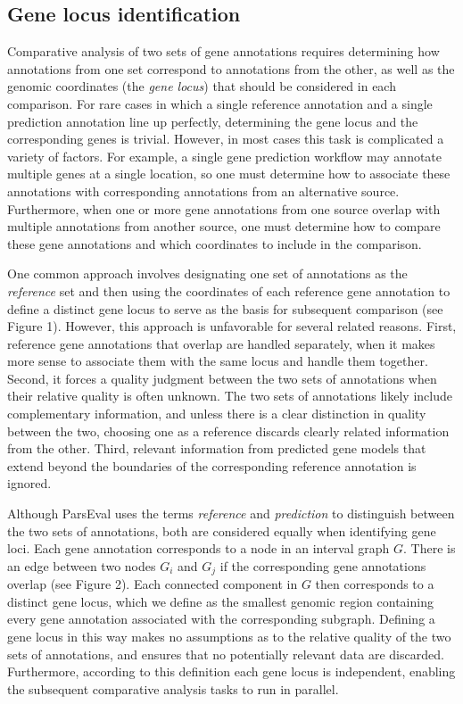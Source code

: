 \subsection{Gene locus identification}
Comparative analysis of two sets of gene annotations requires determining how annotations from one set correspond to annotations from the other, as well as the genomic coordinates (the \emph{gene locus}) that should be considered in each comparison.
For rare cases in which a single reference annotation and a single prediction annotation line up perfectly, determining the gene locus and the corresponding genes is trivial.
However, in most cases this task is complicated a variety of factors.
For example, a single gene prediction workflow may annotate multiple genes at a single location, so one must determine how to associate these annotations with corresponding annotations from an alternative source.
Furthermore, when one or more gene annotations from one source overlap with multiple annotations from another source, one must determine how to compare these gene annotations and which coordinates to include in the comparison.

One common approach involves designating one set of annotations as the \emph{reference} set and then using the coordinates of each reference gene annotation to define a distinct gene locus to serve as the basis for subsequent comparison (see Figure 1).
However, this approach is unfavorable for several related reasons.
First, reference gene annotations that overlap are handled separately, when it makes more sense to associate them with the same locus and handle them together.
Second, it forces a quality judgment between the two sets of annotations when their relative quality is often unknown.
The two sets of annotations likely include complementary information, and unless there is a clear distinction in quality between the two, choosing one as a reference discards clearly related information from the other.
Third, relevant information from predicted gene models that extend beyond the boundaries of the corresponding reference annotation is ignored.

Although ParsEval uses the terms \emph{reference} and \emph{prediction} to distinguish between the two sets of annotations, both are considered equally when identifying gene loci.
Each gene annotation corresponds to a node in an interval graph $G$.
There is an edge between two nodes $G_i$ and $G_j$ if the corresponding gene annotations overlap (see Figure 2).
Each connected component in $G$ then corresponds to a distinct gene locus, which we define as the smallest genomic region containing every gene annotation associated with the corresponding subgraph.
Defining a gene locus in this way makes no assumptions as to the relative quality of the two sets of annotations, and ensures that no potentially relevant data are discarded.
Furthermore, according to this definition each gene locus is independent, enabling the subsequent comparative analysis tasks to run in parallel.

